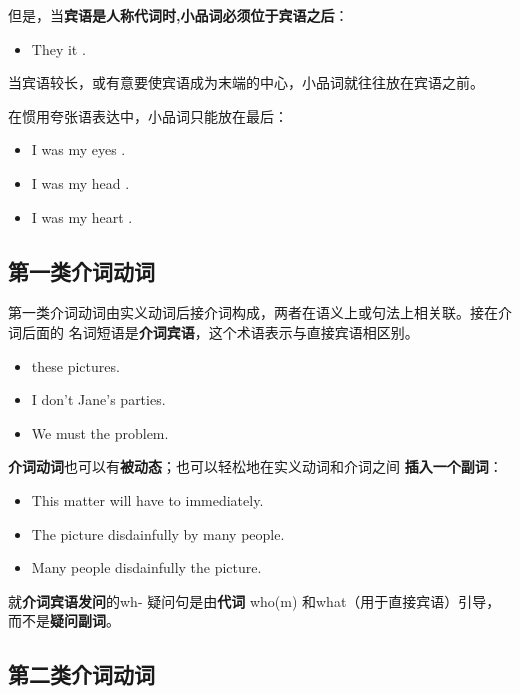 但是，当\textbf{宾语是人称代词时,小品词必须位于宾语之后}：
\begin{itemize}
\item They  it .
\end{itemize}当宾语较长，或有意要使宾语成为末端的中心，小品词就往往放在宾语之前。

在惯用夸张语表达中，小品词只能放在最后：
\begin{itemize}
\item I was  my eyes .
\item I was  my head .
\item I was  my heart .
\end{itemize}

\subsection{第一类介词动词}

第一类介词动词由实义动词后接介词构成，两者在语义上或句法上相关联。接在介词后面的
名词短语是\textbf{介词宾语}，这个术语表示与直接宾语相区别。
\begin{itemize}
\item {} these pictures.

\item I don't  Jane's parties.

\item We must  the problem.

\end{itemize}


\textbf{介词动词}也可以有\textbf{被动态}；也可以轻松地在实义动词和介词之间
\textbf{插入一个副词}：
\begin{itemize}
\item This matter will have to  immediately.
\item The picture  disdainfully by many people.
\item Many people  disdainfully  the picture.
\end{itemize}

就\textbf{介词宾语发问}的wh- 疑问句是由\textbf{代词} who(m) 和what（用于直接宾语）引导，而不是\textbf{疑问副词}。

\subsection{第二类介词动词}

